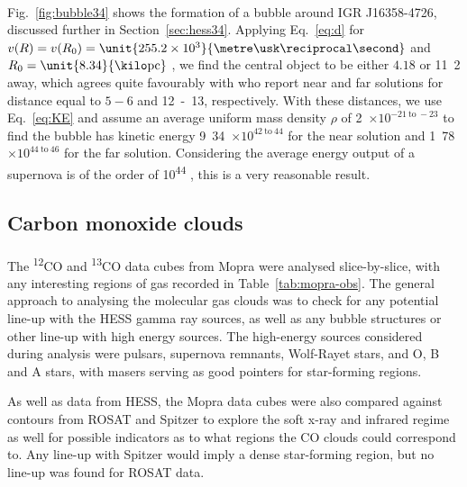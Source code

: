 \documentclass[a4paper, titlepage, oneside]{article}
\newcommand{\elem}[2]{\textsuperscript{#1}{#2}}
\newcommand{\e}[1]{\ensuremath{\times 10^{#1}}}
\newcommand{\parsec}{\mathrm{pc}}
\begin{document}
\begin{multicols}{2}
\paragraph{}
Fig.~\ref{fig:bubble34} shows the formation of a bubble around IGR J16358-4726, discussed further in Section~\ref{sec:hess34}. Applying Eq.~\ref{eq:d} for \(v(R) = v(R_0) = \unit{255.2\e{3}}{\metre\usk\reciprocal\second}\) and \(R_0 = \unit{8.34}{\kilo\parsec}\) \parencite{Reid:2014}, we find the central object to be either \(4.18\) or \unit{11.2}{\kilo\parsec} away, which agrees quite favourably with \textcite{Lutovinov:2005} who report near and far solutions for distance equal to \(5 - 6\) and \unit{12 - 13}{\kilo\parsec}, respectively. With these distances, we use Eq.~\ref{eq:KE} and assume an average uniform mass density \(\rho\) of \unit{2\e{-21 \mathrm{~to~} -23}}{\kilo\gram\usk\centi\metre\rpcubed} \parencite{Ferriere:2001} to find the bubble has kinetic energy \unit{9.34\e{42 \mathrm{~to~} 44}}{\joule} for the near solution and \unit{1.78\e{44 \mathrm{~to~} 46}}{\joule} for the far solution. Considering the average energy output of a supernova is of the order of \unit{10^{44}}{\joule} \parencite{Khokhlov:1993}, this is a very reasonable result.

\subsection{Carbon monoxide clouds}
\paragraph{}
The \elem{12}{C}O and \elem{13}{C}O data cubes from Mopra were analysed slice-by-slice, with any interesting regions of gas recorded in Table~\ref{tab:mopra-obs}. The general approach to analysing the molecular gas clouds was to check for any potential line-up with the HESS gamma ray sources, as well as any bubble structures or other line-up with high energy sources. The high-energy sources considered during analysis were pulsars, supernova remnants, Wolf-Rayet stars, and O, B and A stars, with masers serving as good pointers for star-forming regions.

As well as data from HESS, the Mopra data cubes were also compared against contours from ROSAT and Spitzer to explore the soft x-ray and infrared regime as well for possible indicators as to what regions the CO clouds could correspond to. Any line-up with Spitzer would imply a dense star-forming region, but no line-up was found for ROSAT data.


\end{multicols}
\end{document}
